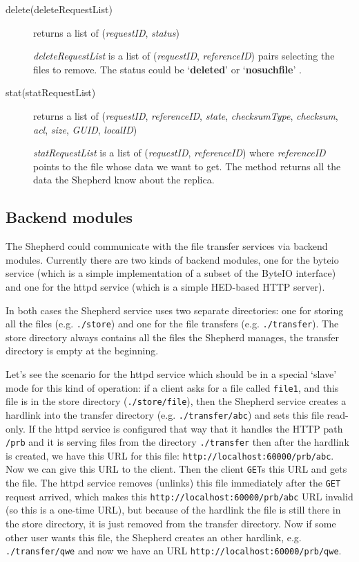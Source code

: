 \documentclass{book}
\begin{document}
\begin{description}
    \item[delete(deleteRequestList)] returns a list of (\emph{requestID}, \emph{status})
    
    \emph{deleteRequestList} is a list of (\emph{requestID}, \emph{referenceID}) pairs selecting the files to remove. The status could be `\textbf{deleted}' or `\textbf{nosuchfile}'
    .
    \item[stat(statRequestList)] returns a list of (\emph{requestID}, \emph{referenceID}, \emph{state}, \emph{checksumType}, \emph{checksum}, \emph{acl}, \emph{size}, \emph{GUID}, \emph{localID})
    
    \emph{statRequestList} is a list of (\emph{requestID}, \emph{referenceID}) where \emph{referenceID} points to the file whose data we want to get. The method returns all the data the Shepherd know about the replica.
     
\end{description}


\subsection{Backend modules} %
\label{sub:backend_modules}

The Shepherd could communicate with the file transfer services via backend modules. Currently there are two kinds of backend modules, one for the byteio service (which is a simple implementation of a subset of the ByteIO interface) and one for the httpd service (which is a simple HED-based HTTP server).

In both cases the Shepherd service uses two separate directories: one for storing all the files (e.g. \verb!./store!) and one for the file transfers (e.g. \verb!./transfer!). The store directory always contains all the files the Shepherd manages, the transfer directory is empty at the beginning.

Let's see the scenario for the httpd service which should be in a special `slave' mode for this kind of operation: if a client asks for a file called \verb!file1!, and this file is in the store directory (\verb!./store/file!), then the Shepherd service creates a hardlink into the transfer directory (e.g. \verb!./transfer/abc!) and sets this file read-only. If the httpd service is configured that way that it handles the HTTP path \verb!/prb! and it is serving files from the directory \verb!./transfer! then after the hardlink is created, we have this URL for this file: \verb!http://localhost:60000/prb/abc!. Now we can give this URL to the client. Then the client \verb!GET!s this URL and gets the file. The httpd service removes (unlinks) this file immediately after the \verb!GET! request arrived, which makes this \verb!http://localhost:60000/prb/abc! URL invalid (so this is a one-time URL), but because of the hardlink the file is still there in the store directory, it is just removed from the transfer directory. Now if some other user wants this file, the Shepherd creates an other hardlink, e.g. \verb!./transfer/qwe! and now we have an URL \verb!http://localhost:60000/prb/qwe!.
\end{document}

